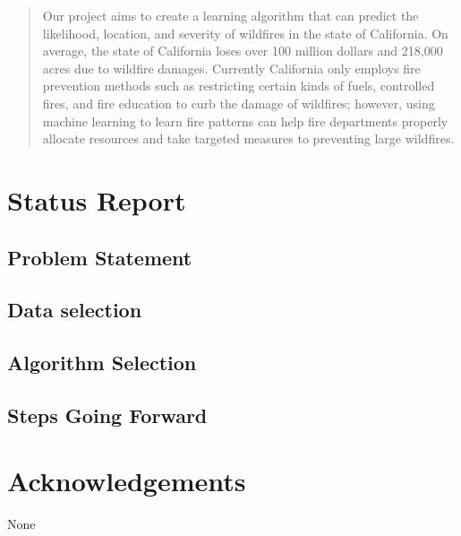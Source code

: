 \documentclass{article}
\begin{document}
 


\begin{abstract}
Our project aims to create a learning algorithm that can predict the likelihood, location, and severity of wildfires in the state of California. On average, the state of California loses over 100 million dollars and 218,000 acres\cite{calfire11} due to wildfire damages. Currently California only employs fire prevention methods such as restricting certain kinds of fuels, controlled fires, and fire education to curb the damage of wildfires; however, using machine learning to learn fire patterns can help fire departments properly allocate resources and take targeted measures to preventing large wildfires.
\end{abstract} 

\section{Status Report}
\subsection{Problem Statement }
\subsection{Data selection} 
\subsection{Algorithm Selection}
\subsection{Steps Going Forward}

\section*{Acknowledgements} 
None



\end{document}
